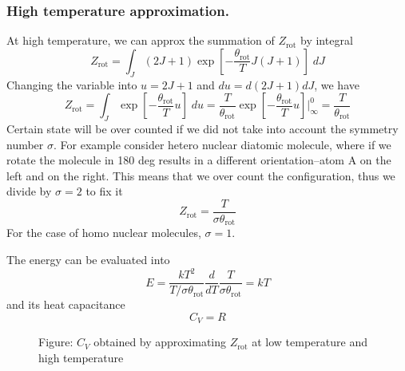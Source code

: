 \documentclass[../../../Main.tex]{subfiles}
\begin{document}
\subsubsection{High temperature approximation.} At high temperature, we can approx the summation of $Z_\text{rot}$ by integral
\begin{equation*}
	Z_\text{rot}=\int_J (2J+1)\exp\left[-\frac{\theta_\text{rot}}{T}J(J+1)\right]\;dJ
\end{equation*}
Changing the variable into $u=2J+1$ and $du=d(2J+1)dJ$, we have
\begin{equation*}
	Z_\text{rot}=\int_J\exp\left[-\frac{\theta_\text{rot}}{T}u\right]\;du=\frac{T}{\theta_\text{rot}}\exp\left[-\frac{\theta_\text{rot}}{T}u\right]\bigg|_\infty^0=\frac{T}{\theta_\text{rot}}
\end{equation*}
Certain state will be over counted if we did not take into account the symmetry number $\sigma$. For example consider hetero nuclear diatomic molecule, where if we rotate the molecule in 180 deg results in a different orientation--atom A on the left and on the right. This means that we over count the configuration, thus we divide by $\sigma=2$ to fix it
\begin{equation*}
	Z_\text{rot}=\frac{T}{\sigma\theta_\text{rot}}
\end{equation*}
For the case of homo nuclear molecules, $\sigma=1$.

The energy can be evaluated into
\begin{equation*}
	E=\frac{kT^2}{T/\sigma\theta_\text{rot}}\frac{d}{dT}\frac{T}{\sigma\theta_\text{rot}}=kT
\end{equation*}
and its heat capacitance
\begin{equation*}
	C_V=R
\end{equation*}

\begin{figure}
	\centering
	\caption*{Figure: $C_V$ obtained by approximating $Z_\text{rot}$ at low temperature and high temperature}
\end{figure}
\end{document}
